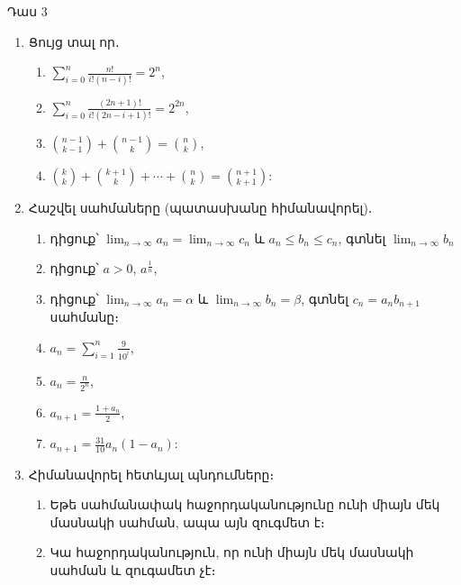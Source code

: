\documentclass{article}
\begin{document}

Դաս $3$\\
\vspace{2cm}
\begin{enumerate}
    \item Ցույց տալ որ․
    \begin{enumerate}
        \item $\sum_{i = 0}^n \frac{n!}{i!(n-i)!} = 2^n$,
        \item $\sum_{i = 0}^{n} \frac{(2n+1)!}{i!(2n-i+1)!} = 2^{2n}$,
        \item $\binom{n-1}{k-1} + \binom{n-1}{k} = \binom{n}{k}$,
        \item $\binom{k}{k} + \binom{k+1}{k} + \cdots + \binom{n}{k} = \binom{n+1}{k+1}$:
    \end{enumerate}
    \item Հաշվել սահմաները (պատասխանը հիմանավորել)․
    \begin{enumerate}
        \item դիցուք՝ $\lim_{n\rightarrow \infty}a_n = \lim_{n\rightarrow \infty}c_n$ և $ a_n \leq b_n \leq c_n$, գտնել $\lim_{n\rightarrow \infty}b_n$
        \item դիցուք՝ $a > 0$, $a^{\frac{1}{n}}$,
        \item դիցուք՝ $\lim_{n\rightarrow \infty}a_n = \alpha$ և $\lim_{n\rightarrow \infty}b_n = \beta$, գտնել $c_n = a_nb_{n+1}$ սահմանը։
        \item $a_n = \sum_{i=1}^n \frac{9}{10^i}$,
        \item $a_n = \frac{n}{2^n}$,
        \item $a_{n+1} = \frac{1+a_n}{2}$,
        \item $a_{n+1} = \frac{31}{10} a_n (1- a_n)$:
    \end{enumerate}
    \item Հիմանավորել հետևյալ պնդումները։
    \begin{enumerate}
        \item Եթե սահմանափակ հաջորդականությունը ունի միայն մեկ մասնակի սահման, ապա այն զուգմետ է։
        \item Կա հաջորդականություն, որ ունի միայն մեկ մասնակի սահման և զուգամետ չէ։
    \end{enumerate}
\end{enumerate}
\end{document}
